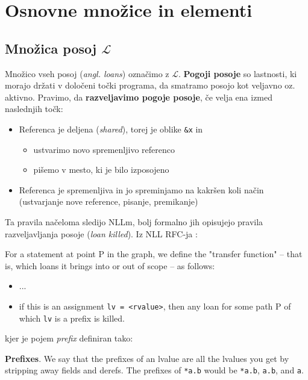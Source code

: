 \documentclass[a4paper,12pt,openright]{book}
\begin{document}
\section{Osnovne množice in elementi}

\subsection{Množica posoj $\mathcal{L}$}
Množico vseh posoj (\textit{angl. loans}) označimo z $\mathcal{L}$. \textbf{Pogoji posoje} so lastnosti, ki morajo
držati v določeni točki programa, da smatramo posojo kot veljavno oz. aktivno.
Pravimo, da \textbf{razveljavimo pogoje posoje}, če velja ena izmed naslednjih točk:
\begin{itemize}
	\item Referenca je deljena (\textit{shared}), torej je oblike \verb|&x| in
	      \begin{itemize}
		      \item ustvarimo novo spremenljivo referenco
		      \item pišemo v mesto, ki je bilo izposojeno
	      \end{itemize}
	\item Referenca je spremenljiva in jo spreminjamo na kakršen koli način (ustvarjanje nove reference, pisanje, premikanje)
\end{itemize}

Ta pravila načeloma sledijo NLLm, bolj formalno jih opisujejo pravila razveljavljanja posoje (\textit{loan killed}).
Iz NLL RFC-ja \cite{2094nllRustRFC}:
\begin{displayquote}
	For a statement at point P in the graph, we define the "transfer function" – that is,
	which loans it brings into or out of scope – as follows:
	\begin{itemize}
		\item ...
		\item if this is an assignment \verb|lv = <rvalue>|, then any loan for some path P of which \verb|lv| is a prefix is killed.
	\end{itemize}
\end{displayquote}

kjer je pojem \textit{prefix} definiran tako:
\begin{displayquote}
	\textbf{Prefixes}. We say that the prefixes of an lvalue are all the lvalues you get by stripping away fields and derefs.
	The prefixes of \verb|*a.b| would be \verb|*a.b|, \verb|a.b|, and \verb|a|.
\end{displayquote}
\end{document}
